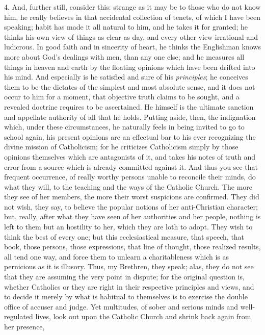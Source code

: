 4. And, further still, consider this: strange as it
may be to those who do not know him, he really believes
in that accidental collection of tenets, of which I have
been speaking; habit has made it all natural to him, and
he takes it for granted; he thinks his own view of things
as clear as day, and every other view irrational and
ludicrous. In good faith and in sincerity of heart, he
thinks the Englishman knows more about God's dealings
with men, than any one else; and he measures all things
in heaven and earth by the floating opinions which have
been drifted into his mind. And especially is he
satisfied and sure of his \emph{principles}; he conceives
them to be the dictates of the simplest and most absolute
sense, and it does not occur to him for a moment, that
objective truth claims to be sought, and a revealed
doctrine requires to be ascertained. He himself is the
ultimate sanction and appellate authority of all that he
holds. Putting aside, then, the indignation which, under
these circumstances, he naturally feels in being invited
to go to school again, his present opinions are an
effectual bar to his ever recognizing the divine mission
of Catholicism; for he criticizes Catholicism simply by
those opinions themselves which are antagonists of it,
and takes his notes of truth and error from a source
which is already committed against it. And thus you see
that frequent occurrence, of really worthy persons unable
to reconcile their minds, do what they will, to the
teaching and the ways of the Catholic Church. The more
they see of her members, the more their worst suspicions
are confirmed. They did not wish, they say, to believe
the popular notions of her anti-Christian character; but,
really, after what they have seen of her authorities and
her people, nothing is left to them but an hostility to
her, which they are loth to adopt. They wish to think the
best of every one; but this ecclesiastical measure, that
speech, that book, those persons, those expressions, that
line of thought, those realized results, all tend one
way, and force them to unlearn a charitableness which is
as pernicious as it is illusory. Thus, my Brethren, they
speak; alas, they do not see that they are assuming the
very point in dispute; for the original question is,
whether Catholics or they are right in their respective
principles and views, and to decide it merely by what is
habitual to themselves is to exercise the double office
of accuser and judge. Yet multitudes, of sober and
serious minds and well-regulated lives, look out upon the
Catholic Church and shrink back again from her presence,
